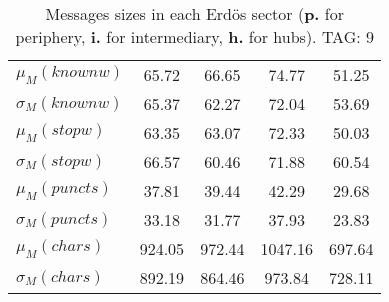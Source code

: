 \begin{table}[h!]
\begin{center}
\begin{tabular}{| l || c | c | c | c |}
$\mu_M(knownw)$ & 65.72  & 66.65  & 74.77  & 51.25 \\
$\sigma_M(knownw)$ & 65.37  & 62.27  & 72.04  & 53.69 \\\hline
$\mu_M(stopw)$ & 63.35  & 63.07  & 72.33  & 50.03 \\
$\sigma_M(stopw)$ & 66.57  & 60.46  & 71.88  & 60.54 \\\hline
$\mu_M(puncts)$ & 37.81  & 39.44  & 42.29  & 29.68 \\
$\sigma_M(puncts)$ & 33.18  & 31.77  & 37.93  & 23.83 \\\hline
$\mu_M(chars)$ & 924.05  & 972.44  & 1047.16  & 697.64 \\
$\sigma_M(chars)$ & 892.19  & 864.46  & 973.84  & 728.11 \\\hline
\end{tabular}
\caption{Messages sizes in each Erd\"os sector ({{\bf p.}} for periphery, {{\bf i.}} for intermediary, {{\bf h.}} for hubs). TAG: 9}
\end{center}
\end{table}